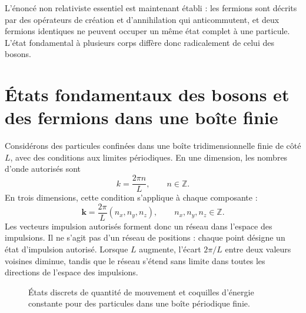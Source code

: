 \begin{classroomqa}
\end{classroomqa}

L’énoncé non relativiste essentiel est maintenant établi : les fermions sont décrits par des opérateurs de création et d’annihilation qui anticommutent, et deux fermions identiques ne peuvent occuper un même état complet à une particule. L’état fondamental à plusieurs corps diffère donc radicalement de celui des bosons.

\section{États fondamentaux des bosons et des fermions dans une boîte finie}

Considérons des particules confinées dans une boîte tridimensionnelle finie de côté \(L\), avec des conditions aux limites périodiques. En une dimension, les nombres d’onde autorisés sont
\begin{equation}
k=\frac{2\pi n}{L},
\qquad n\in\mathbb{Z}.
\end{equation}
En trois dimensions, cette condition s’applique à chaque composante :
\begin{equation}
\mathbf{k}=\frac{2\pi}{L}(n_x,n_y,n_z),
\qquad n_x,n_y,n_z\in\mathbb{Z}.
\end{equation}
Les vecteurs impulsion autorisés forment donc un réseau dans l’espace des impulsions. Il ne s’agit pas d’un réseau de positions : chaque point désigne un état d’impulsion autorisé. Lorsque \(L\) augmente, l’écart \(2\pi/L\) entre deux valeurs voisines diminue, tandis que le réseau s’étend sans limite dans toutes les directions de l’espace des impulsions.

\begin{figure}
\centering
{}
\caption{États discrets de quantité de mouvement et coquilles d’énergie constante pour des particules dans une boîte périodique finie.}
\end{figure}

